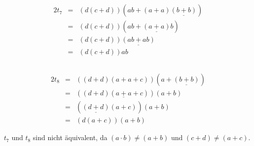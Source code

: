 \documentclass[10pt,a4paper,oneside,ngerman,numbers=noenddot]{scrartcl}
\begin{document}
\section{} %
    \subsection{} %
        \begin{alignat*}{2}
            t_7 &=& (d(c + d))(ab + (a + a)\underline{(b + b)}) \\
            &=& (d(c + d))(ab + \underline{(a + a)}b) \\
            &=& (d(c + d))\underline{(ab + ab)} \\
            &=& (d(c + d))ab
        \end{alignat*}

    \subsection{}
        \begin{alignat*}{2}
            t_8 &=& ((d + d)(a + a + c))(a + \underline{(b + b)}) \\
            &=& ((d + d)(\underline{a + a} + c))(a + b) \\
            &=& (\underline{(d + d)}(a + c))(a + b) \\
            &=& (d(a + c))(a + b)
        \end{alignat*}

        \(t_7\) und \(t_8\) sind nicht äquivalent, da \((a \cdot b) \neq (a + b)\) und \((c + d) \neq (a + c)\).
\end{document}
